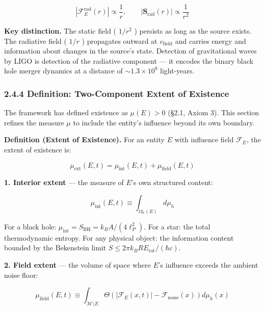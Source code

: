 \documentclass[11pt,a4paper]{article}
\theoremstyle{definition}
\theoremstyle{remark}
\begin{document}
\begin{equation}
|\mathcal{F}_E^{\text{rad}}(r)| \propto \frac{1}{r}, \qquad |\mathbf{S}_{\text{rad}}(r)| \propto \frac{1}{r^2}
\end{equation}


\textbf{Key distinction.} The static field ( $1/r^2$ ) persists as long as the source exists. The radiative field ( $1/r$ ) propagates outward at $v_{\text{field}}$ and carries energy and information about changes in the source's state. Detection of gravitational waves by LIGO is detection of the radiative component — it encodes the binary black hole merger dynamics at a distance of $\sim 1.3 \times 10^9$ light-years.

\subsubsection{2.4.4 Definition: Two-Component Extent of Existence}

The framework has defined existence as $\mu(E) > 0$ (\S 2.1, Axiom 3). This section refines the measure $\mu$ to include the entity's influence beyond its own boundary.

\textbf{Definition (Extent of Existence).} For an entity $E$ with influence field $\mathcal{F}_E$, the extent of existence is:


\begin{equation}
\boxed{\mu_{\text{ext}}(E, t) = \mu_{\text{int}}(E, t) + \mu_{\text{field}}(E, t)}
\end{equation}


\textbf{1. Interior extent} — the measure of $E$'s own structured content:


\begin{equation}
\mu_{\text{int}}(E, t) \equiv \int_{\Omega_{\mathbb{R}}(E)} d\mu_h
\end{equation}


For a black hole: $\mu_{\text{int}} = S_{\text{BH}} = k_B A / (4 \ell_P^2)$. For a star: the total thermodynamic entropy. For any physical object: the information content bounded by the Bekenstein limit $S \leq 2\pi k_B R E_{\text{tot}} / (\hbar c)$.

\textbf{2. Field extent} — the volume of space where $E$'s influence exceeds the ambient noise floor:


\begin{equation}
\mu_{\text{field}}(E, t) \equiv \int_{\mathcal{M} \setminus E} \Theta\left( |\mathcal{F}_E(x, t)| - \mathcal{F}_{\text{noise}}(x) \right) d\mu_h(x)
\end{equation}
\end{document}
